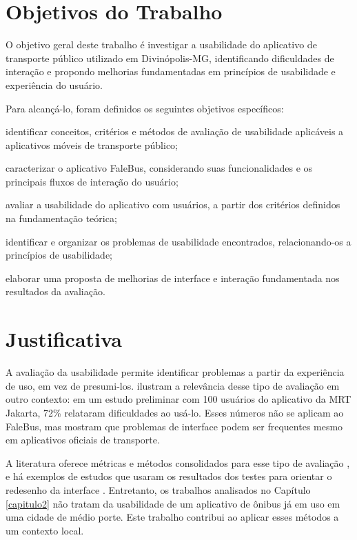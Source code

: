 \section{Objetivos do Trabalho}

O objetivo geral deste trabalho é investigar a usabilidade do aplicativo de transporte público utilizado em Divinópolis-MG, identificando dificuldades de interação e propondo melhorias fundamentadas em princípios de usabilidade e experiência do usuário.

Para alcançá-lo, foram definidos os seguintes objetivos específicos:

\begin{alineas}
  \item identificar conceitos, critérios e métodos de avaliação de usabilidade aplicáveis a aplicativos móveis de transporte público;
  \item caracterizar o aplicativo FaleBus, considerando suas funcionalidades e os principais fluxos de interação do usuário;
  \item avaliar a usabilidade do aplicativo com usuários, a partir dos critérios definidos na fundamentação teórica;
  \item identificar e organizar os problemas de usabilidade encontrados, relacionando-os a princípios de usabilidade;
  \item elaborar uma proposta de melhorias de interface e interação fundamentada nos resultados da avaliação.
\end{alineas}


\section{Justificativa}

A avaliação da usabilidade permite identificar problemas a partir da experiência de uso, em vez de presumi-los.  ilustram a relevância desse tipo de avaliação em outro contexto: em um estudo preliminar com 100 usuários do aplicativo da MRT Jakarta, 72\% relataram dificuldades ao usá-lo. Esses números não se aplicam ao FaleBus, mas mostram que problemas de interface podem ser frequentes mesmo em aplicativos oficiais de transporte.

A literatura oferece métricas e métodos consolidados para esse tipo de avaliação \cite{hussain2017}, e há exemplos de estudos que usaram os resultados dos testes para orientar o redesenho da interface \cite{suzianti2020}. Entretanto, os trabalhos analisados no Capítulo \ref{capitulo2} não tratam da usabilidade de um aplicativo de ônibus já em uso em uma cidade de médio porte. Este trabalho contribui ao aplicar esses métodos a um contexto local.

